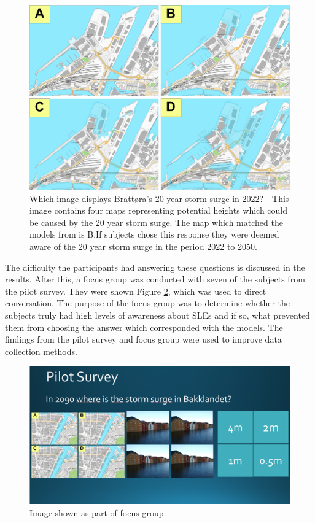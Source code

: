 \begin{figure}[H]
    \centering
    \includegraphics[width=16cm]{fig/brattora question on 2022 20 yr storm surge quadrant.png}
    \caption{Which image displays Brattøra's 20 year storm surge in 2022? - This image contains four maps representing potential heights which could be caused by the 20 year storm surge. The map which matched the models from \cite{kartverket_se_2021} is B.If subjects chose this response they were deemed aware of the 20 year storm surge in the period 2022 to 2050.}
    \label{fig:brattora_2022_stormsurge}
\end{figure}

The difficulty the participants had answering these questions is discussed in the results. After this, a focus group was conducted with seven of the subjects from the pilot survey.  They were shown Figure \ref{fig:slide}, which was used to direct conversation. The purpose of the focus group was to determine whether the subjects truly had high levels of awareness about SLEs and if so, what prevented them from choosing the answer which corresponded with the models. The findings from the pilot survey and focus group were used to improve data collection methods. 

\begin{figure}[H]
    \centering
    \includegraphics[width=1\textwidth]{fig_results/slide-pilot-survey.png}
    \caption{Image shown as part of focus group}
    \label{fig:slide}
\end{figure}

